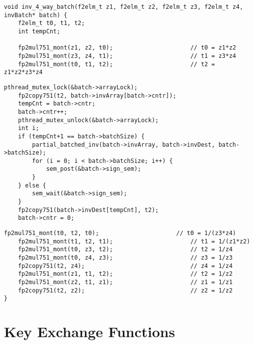 \begin{lstlisting}[basicstyle=\tiny,]
void inv_4_way_batch(f2elm_t z1, f2elm_t z2, f2elm_t z3, f2elm_t z4, invBatch* batch) {
  	f2elm_t t0, t1, t2;
	int tempCnt;

    fp2mul751_mont(z1, z2, t0);                      // t0 = z1*z2
    fp2mul751_mont(z3, z4, t1);                      // t1 = z3*z4
    fp2mul751_mont(t0, t1, t2);                      // t2 = z1*z2*z3*z4
\end{lstlisting}
\vspace{-0.75\baselineskip}
\begin{lstlisting}[backgroundcolor = \color{light-green}, firstnumber=8, basicstyle=\tiny]
	pthread_mutex_lock(&batch->arrayLock);
	fp2copy751(t2, batch->invArray[batch->cntr]);
	tempCnt = batch->cntr;
	batch->cntr++;
	pthread_mutex_unlock(&batch->arrayLock);
	int i;
	if (tempCnt+1 == batch->batchSize) {
		partial_batched_inv(batch->invArray, batch->invDest, batch->batchSize);
		for (i = 0; i < batch->batchSize; i++) {
			sem_post(&batch->sign_sem);
		}
	} else {
		sem_wait(&batch->sign_sem);
	}
	fp2copy751(batch->invDest[tempCnt], t2);
	batch->cntr = 0;
\end{lstlisting}
\vspace{-0.9\baselineskip}
\begin{lstlisting}[firstnumber=24,basicstyle=\tiny]
    fp2mul751_mont(t0, t2, t0);                      // t0 = 1/(z3*z4)
    fp2mul751_mont(t1, t2, t1);                      // t1 = 1/(z1*z2)
    fp2mul751_mont(t0, z3, t2);                      // t2 = 1/z4
    fp2mul751_mont(t0, z4, z3);                      // z3 = 1/z3
    fp2copy751(t2, z4);                              // z4 = 1/z4
    fp2mul751_mont(z1, t1, t2);                      // t2 = 1/z2
    fp2mul751_mont(z2, t1, z1);                      // z1 = 1/z1
    fp2copy751(t2, z2);                              // z2 = 1/z2
}
\end{lstlisting}

\section{Key Exchange Functions}


